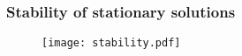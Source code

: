 \documentclass[10pt,aspectratio=169]{beamer}
\newenvironment{nalign}{
	\begin{equation}
	\begin{aligned}
}{
	\end{aligned}
	\end{equation}
	\ignorespacesafterend
}
\begin{document}


\begin{frame}
\frametitle{Stability of stationary solutions}
\begin{figure}
	\texttt{[image: stability.pdf]}
\end{figure}
\end{frame}

\end{document}
